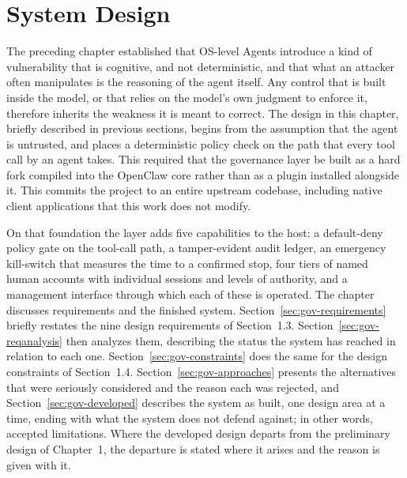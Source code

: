 \providecommand{\sectionstub}[1]{\emph{[Outline: #1]}\par}

\chapter{System Design}
\label{ch:design}


The preceding chapter established that OS-level Agents introduce a
kind of vulnerability that is cognitive, and not deterministic, and that what
an attacker often manipulates is the reasoning of the agent itself. Any control that is
built inside the model, or that relies on the model's own judgment to enforce
it, therefore inherits the weakness it is meant to correct. The design in this chapter, briefly described in previous sections, begins from the
assumption that the agent is untrusted, and places a deterministic policy check
on the path that every tool call by an agent takes. This required that the
governance layer be built as a hard fork compiled into the OpenClaw core rather
than as a plugin installed alongside it. This commits the project to an entire upstream codebase, including native client
applications that this work does not modify.

On that foundation the layer adds five capabilities to the host: a default-deny
policy gate on the tool-call path, a tamper-evident audit ledger, an emergency kill-switch that measures the time to a confirmed stop, four tiers of named human accounts with individual sessions and levels of authority, and a management interface through which each of these is operated.
The chapter discusses requirements and the finished system.
Section~\ref{sec:gov-requirements} briefly restates the nine design requirements of
Section~1.3.
Section~\ref{sec:gov-reqanalysis} then analyzes them, describing the status the system has reached in relation to each one.
Section~\ref{sec:gov-constraints} does the same for the design constraints of
Section~1.4. Section~\ref{sec:gov-approaches} presents
the alternatives that were seriously considered and the reason each was
rejected, and Section~\ref{sec:gov-developed} describes the system as built, one
design area at a time, ending with what the system does not defend against; in other words, accepted limitations.
Where the developed design departs from the preliminary design of Chapter~1, the
departure is stated where it arises and the reason is given with it.

